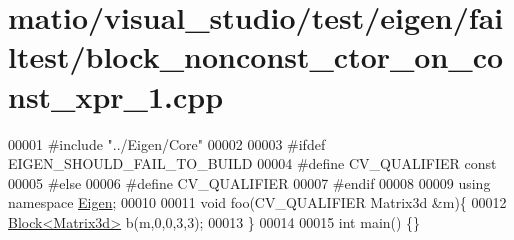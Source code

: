 \hypertarget{matio_2visual__studio_2test_2eigen_2failtest_2block__nonconst__ctor__on__const__xpr__1_8cpp_source}{}\section{matio/visual\+\_\+studio/test/eigen/failtest/block\+\_\+nonconst\+\_\+ctor\+\_\+on\+\_\+const\+\_\+xpr\+\_\+1.cpp}
\label{matio_2visual__studio_2test_2eigen_2failtest_2block__nonconst__ctor__on__const__xpr__1_8cpp_source}

\begin{DoxyCode}
00001 \textcolor{preprocessor}{#include "../Eigen/Core"}
00002 
00003 \textcolor{preprocessor}{#ifdef EIGEN\_SHOULD\_FAIL\_TO\_BUILD}
00004 \textcolor{preprocessor}{#define CV\_QUALIFIER const}
00005 \textcolor{preprocessor}{#else}
00006 \textcolor{preprocessor}{#define CV\_QUALIFIER}
00007 \textcolor{preprocessor}{#endif}
00008 
00009 \textcolor{keyword}{using namespace }\hyperlink{namespace_eigen}{Eigen};
00010 
00011 \textcolor{keywordtype}{void} foo(CV\_QUALIFIER Matrix3d &m)\{
00012     \hyperlink{group___core___module_class_eigen_1_1_block}{Block<Matrix3d>} b(m,0,0,3,3);
00013 \}
00014 
00015 \textcolor{keywordtype}{int} main() \{\}
\end{DoxyCode}
